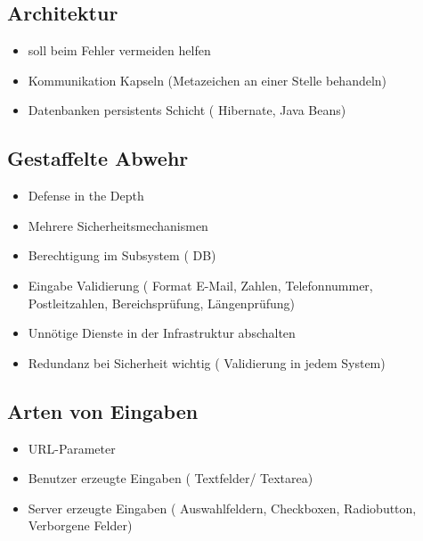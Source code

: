 \subsection*{ Architektur }
\begin{itemize}
	\item soll beim Fehler vermeiden helfen
	\item Kommunikation Kapseln (Metazeichen an einer Stelle behandeln)
	\item Datenbanken persistents Schicht ( Hibernate, Java Beans)
\end{itemize}

\subsection*{ Gestaffelte Abwehr }
\begin{itemize}
	\item Defense in the Depth
	\item Mehrere Sicherheitsmechanismen
	\item Berechtigung im Subsystem ( DB)
	\item Eingabe Validierung ( Format E-Mail, Zahlen, Telefonnummer, Postleitzahlen, Bereichsprüfung, Längenprüfung)
	\item Unnötige Dienste in der Infrastruktur abschalten
	\item Redundanz bei Sicherheit wichtig ( Validierung in jedem System)
\end{itemize}

\subsection*{ Arten von Eingaben }
\begin{itemize}
	\item URL-Parameter
	\item Benutzer erzeugte Eingaben ( Textfelder/ Textarea)
	\item Server erzeugte Eingaben ( Auswahlfeldern, Checkboxen,  Radiobutton, Verborgene Felder)
\end{itemize}

